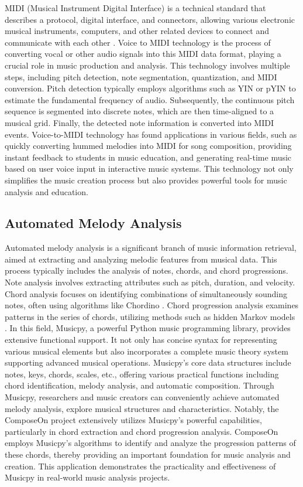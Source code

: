 MIDI (Musical Instrument Digital Interface) is a technical standard that describes a protocol, digital interface, and connectors, allowing various electronic musical instruments, computers, and other related devices to connect and communicate with each other \citep{midi1996complete}. Voice to MIDI technology is the process of converting vocal or other audio signals into this MIDI data format, playing a crucial role in music production and analysis. This technology involves multiple steps, including pitch detection, note segmentation, quantization, and MIDI conversion. Pitch detection typically employs algorithms such as YIN \citep{decheveigne2002yin} or pYIN \citep{mauch2014pyin} to estimate the fundamental frequency of audio. Subsequently, the continuous pitch sequence is segmented into discrete notes, which are then time-aligned to a musical grid. Finally, the detected note information is converted into MIDI events. Voice-to-MIDI technology has found applications in various fields, such as quickly converting hummed melodies into MIDI for song composition, providing instant feedback to students in music education, and generating real-time music based on user voice input in interactive music systems. This technology not only simplifies the music creation process but also provides powerful tools for music analysis and education.

\subsection{Automated Melody Analysis}

Automated melody analysis is a significant branch of music information retrieval, aimed at extracting and analyzing melodic features from musical data. This process typically includes the analysis of notes, chords, and chord progressions. Note analysis involves extracting attributes such as pitch, duration, and velocity. Chord analysis focuses on identifying combinations of simultaneously sounding notes, often using algorithms like Chordino \citep{mauch2010simultaneous}. Chord progression analysis examines patterns in the series of chords, utilizing methods such as hidden Markov models \citep{rohrmeier2012comparing}. In this field, Musicpy, a powerful Python music programming library, provides extensive functional support. It not only has concise syntax for representing various musical elements but also incorporates a complete music theory system supporting advanced musical operations. Musicpy's core data structures include notes, keys, chords, scales, etc., offering various practical functions including chord identification, melody analysis, and automatic composition. Through Musicpy, researchers and music creators can conveniently achieve automated melody analysis, explore musical structures and characteristics. Notably, the ComposeOn project extensively utilizes Musicpy's powerful capabilities, particularly in chord extraction and chord progression analysis. ComposeOn employs Musicpy's algorithms to identify and analyze the progression patterns of these chords, thereby providing an important foundation for music analysis and creation. This application demonstrates the practicality and effectiveness of Musicpy in real-world music analysis projects.

